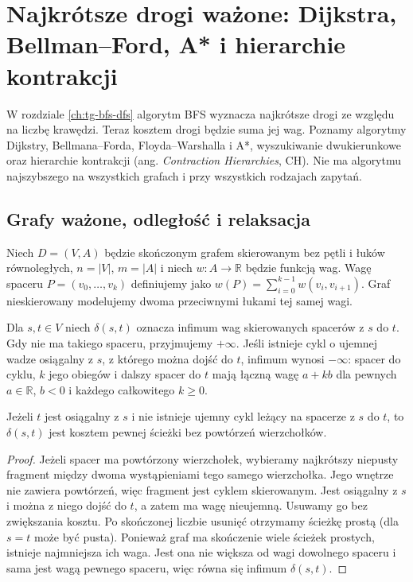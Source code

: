 \chapter{Najkrótsze drogi ważone: Dijkstra, Bellman--Ford, A* i hierarchie kontrakcji}
\label{ch:tg-shortest-paths}

W rozdziale \ref{ch:tg-bfs-dfs} algorytm BFS wyznacza
najkrótsze drogi ze względu na liczbę krawędzi.
Teraz kosztem drogi będzie suma jej wag.
Poznamy algorytmy Dijkstry, Bellmana--Forda,
Floyda--Warshalla i A*, wyszukiwanie dwukierunkowe
oraz hierarchie kontrakcji (ang. \emph{Contraction Hierarchies}, CH).
Nie ma algorytmu najszybszego na wszystkich grafach
i przy wszystkich rodzajach zapytań.

\section{Grafy ważone, odległość i relaksacja}
\label{sec:tg-weighted-data}

Niech $D=(V,A)$ będzie skończonym grafem skierowanym
bez pętli i łuków równoległych, $n=|V|$, $m=|A|$ i niech
$w\colon A\to\mathbb R$ będzie funkcją wag.
Wagę spaceru $P=(v_0,\ldots,v_k)$ definiujemy jako
$w(P)=\sum_{i=0}^{k-1}w(v_i,v_{i+1})$.
Graf nieskierowany modelujemy dwoma przeciwnymi
łukami tej samej wagi.

\begin{definicja}
\label{def:tg-weighted-distance}
Dla $s,t\in V$ niech $\delta(s,t)$ oznacza infimum
wag skierowanych spacerów z $s$ do $t$.
Gdy nie ma takiego spaceru, przyjmujemy $+\infty$.
Jeśli istnieje cykl o ujemnej wadze osiągalny z $s$,
z którego można dojść do $t$, infimum wynosi $-\infty$:
spacer do cyklu, $k$ jego obiegów i dalszy spacer do $t$
mają łączną wagę $a+kb$ dla pewnych $a\in\mathbb R$,
$b<0$ i każdego całkowitego $k\geq0$.
\end{definicja}

\begin{lemat}
\label{lem:tg-weighted-realization}
Jeżeli $t$ jest osiągalny z $s$ i nie istnieje
ujemny cykl leżący na spacerze z $s$ do $t$,
to $\delta(s,t)$ jest kosztem pewnej
ścieżki bez powtórzeń wierzchołków.
\end{lemat}
\begin{proof}
Jeżeli spacer ma powtórzony wierzchołek, wybieramy
najkrótszy niepusty fragment między dwoma wystąpieniami
tego samego wierzchołka. Jego wnętrze nie zawiera
powtórzeń, więc fragment jest cyklem skierowanym.
Jest osiągalny z $s$ i można z niego dojść do $t$,
a zatem ma wagę nieujemną. Usuwamy go bez
zwiększania kosztu. Po skończonej liczbie
usunięć otrzymamy ścieżkę prostą (dla $s=t$ może być pusta).
Ponieważ graf ma skończenie wiele ścieżek prostych,
istnieje najmniejsza ich waga. Jest ona nie większa od wagi
dowolnego spaceru i sama jest wagą pewnego spaceru,
więc równa się infimum $\delta(s,t)$.
\end{proof}

